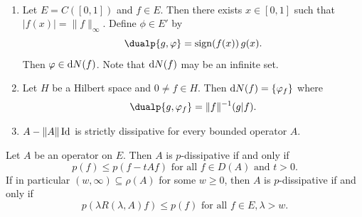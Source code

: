 \phantom{x}
\begin{examples}\label{ex:a2-2.2}  ~ 
\begin{enumerate}[\upshape(i), wide, labelindent=.25em]

\item \label{ex:a2-2.2.1}
Let $E = C([0,1])$ and $f \in E$.
Then there exists $x \in [0,1]$ such that $|f(x)| = \|f\|_{\infty}$.
Define $\phi \in E'$ by 
%
\[
	\dualp{g,\phi} = \sign(f(x))\,g(x) .
\]
%
Then $\phi \in \dN(f)$.
Note that $\mathop{}\!\mathrm{d}{N}(f)$ may be an infinite set.
\item \label{ex:a2-2.2.2}
Let $H$ be a Hilbert space and $ 0 \neq f \in H$. %
Then  $\dN(f) = \{\phi_{f}\}$ where 
%
\[
    \dualp{g,\phi_{f}} = \|f\|^{-1}(g \vert f) .
\]
%
\item \label{ex:a2-2.2.3}
$A - \|A\|\operatorname{Id}$ is strictly dissipative for every bounded operator $A$.
\end{enumerate}
\end{examples}
\begin{proposition}\label{prop:a2-2.3}
Let $A$ be an operator on $E$.
Then $A$ is $p$-dissipative if and only if
\begin{equation} \label{eq:a2-2.7}
p(f) \leq p(f - tAf) \text{ for all } f \in D(A) \text{ and } t > 0.
\end{equation}
If in particular $(w,\infty) \subseteq \rho(A)$ for some $w \geq 0$, then $A$ is $p$-dissipative if and only if
\begin{equation}\label{eq:a2-2.8}
p(\lambda R(\lambda,A)f) \leq p(f) \text{ for all } f \in E, \lambda > w.
\end{equation}
\end{proposition}
